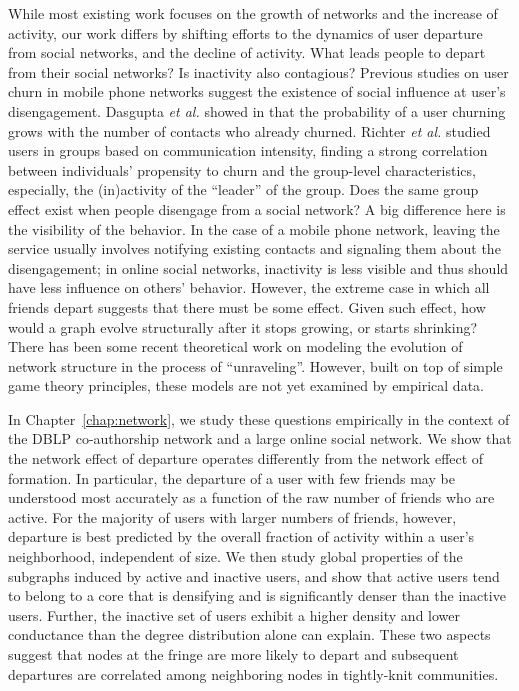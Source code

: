 \documentclass[phd,tocprelim]{cornell}
\begin{document}
While most existing work focuses on the growth of networks and the increase of activity, our work differs by shifting efforts to the dynamics of user departure from social networks, and the decline of activity. What leads people to depart from their social networks? Is inactivity also contagious? 
Previous studies on user churn in mobile phone networks suggest the existence of social influence at user's disengagement. Dasgupta \emph{et al.} showed in \cite{Dasgupta:2008} that the probability of a user churning grows with the number of contacts who already churned. Richter \emph{et al.} studied users in groups based on communication intensity\cite{Richter:2010}, finding a strong correlation between individuals' propensity to churn and the group-level characteristics, especially, the (in)activity of the ``leader'' of the group. Does the same group effect exist when people disengage from a social network? A big difference here is the visibility of the behavior. In the case of a mobile phone network, leaving the service usually involves notifying existing contacts and signaling them about the disengagement; in online social networks, inactivity is less visible and thus should have less influence on others' behavior. However, the extreme case
in which all friends depart suggests that there must be some effect. Given such effect, how would a graph evolve structurally after it stops growing, or starts shrinking? There has been some recent theoretical work on modeling the evolution of network structure in the process of ``unraveling''\cite{Bhawalkar:2012}. 
However, built on top of simple game theory principles, these models are not yet examined by empirical data.

In Chapter~\ref{chap:network}, we study these questions empirically in the context of the DBLP co-authorship network and a large online social network. We show that the network effect of departure operates differently from the network effect of formation.  In particular, the departure of a user with few friends may be understood most accurately as a function of the raw number of friends who are active.  For the majority of users with larger numbers of friends, however, departure is best predicted by the overall fraction of activity within a user's neighborhood, independent of size.  We then study global properties of the subgraphs induced by active and inactive users, and show that active users tend to belong to a core that is densifying and is significantly denser than
the inactive users. Further, the inactive set of users exhibit a higher density and lower conductance than the degree distribution alone can explain. These two aspects suggest that nodes at the fringe are more likely to depart and subsequent departures are correlated among neighboring nodes in tightly-knit communities. 
\end{document}
